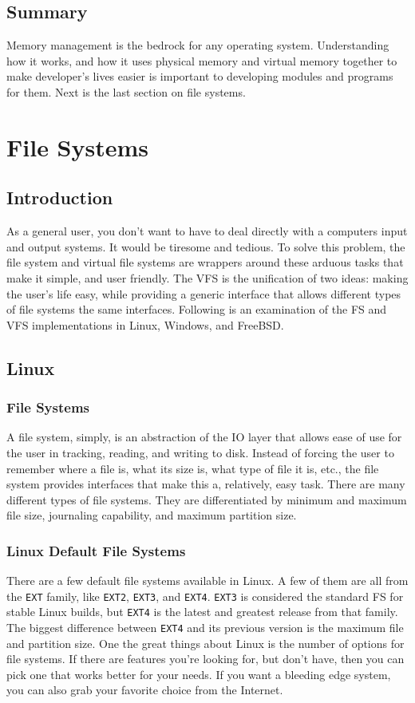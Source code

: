 \documentclass[10pt,letterpaper,onecolumn,draftclsnofoot]{IEEEtran}
\begin{document}
\subsection{Summary}
Memory management is the bedrock for any operating system. Understanding
how it works, and how it uses physical memory and virtual memory together to make developer's lives easier is important to developing modules and programs for them. Next is the last section on file systems.

\section{File Systems}
\subsection{Introduction}
As a general user, you don't want to have to deal directly with a computers
input and output systems. It would be tiresome and tedious. To solve this
problem, the file system and virtual file systems are wrappers around these
arduous tasks that make it simple, and user friendly. The VFS is the unification
of two ideas: making the user's life easy, while providing a generic interface
that allows different types of file systems the same interfaces. Following is
an examination of the FS and VFS implementations in Linux, Windows, and FreeBSD. 
\subsection{Linux}
\subsubsection{File Systems}
A file system, simply, is an abstraction of the IO layer that allows ease of
use for the user in tracking, reading, and writing to disk. Instead of forcing
the user to remember where a file is, what its size is, what type of file it
is, etc., the file system provides interfaces that make this a, relatively,
easy task. There are many different types of file systems. They are 
differentiated by minimum and maximum file size, journaling capability, and
maximum partition size. 
\subsubsection{Linux Default File Systems}
There are a few default file systems available in Linux. A few of them are
all from the \texttt{EXT} family, like \texttt{EXT2}, \texttt{EXT3}, and
\texttt{EXT4}. \texttt{EXT3} is considered the standard FS for stable Linux
builds, but \texttt{EXT4} is the latest and greatest release from that family.
The biggest difference between \texttt{EXT4} and its previous version is the
maximum file and partition size.\cite{anthonyjsimon2015}
One the great things about Linux is the number of options for file systems.
If there are features you're looking for, but don't have, then you can pick
one that works better for your needs. If you want a bleeding edge system, you
can also grab your favorite choice from the Internet. 
\end{document}
